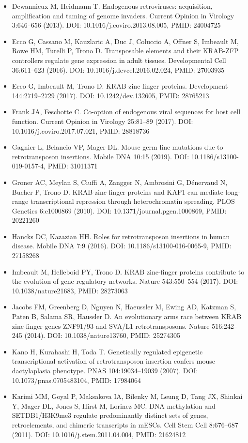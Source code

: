 \documentclass[11pt,a4paper]{article}
\begin{document}
\begin{itemize}
\item Dewannieux M, Heidmann T. Endogenous retroviruses: acquisition, amplification and taming of genome invaders. Current Opinion in Virology 3:646–656 (2013). DOI: 10.1016/j.coviro.2013.08.005, PMID: 24004725
\item Ecco G, Cassano M, Kauzlaric A, Duc J, Coluccio A, Offner S, Imbeault M, Rowe HM, Turelli P, Trono D. Transposable elements and their KRAB-ZFP controllers regulate gene expression in adult tissues. Developmental Cell 36:611–623 (2016). DOI: 10.1016/j.devcel.2016.02.024, PMID: 27003935
\item Ecco G, Imbeault M, Trono D. KRAB zinc finger proteins. Development 144:2719–2729 (2017). DOI: 10.1242/dev.132605, PMID: 28765213
\item Frank JA, Feschotte C. Co-option of endogenous viral sequences for host cell function. Current Opinion in Virology 25:81–89 (2017). DOI: 10.1016/j.coviro.2017.07.021, PMID: 28818736
\item Gagnier L, Belancio VP, Mager DL. Mouse germ line mutations due to retrotransposon insertions. Mobile DNA 10:15 (2019). DOI: 10.1186/s13100-019-0157-4, PMID: 31011371
\item Groner AC, Meylan S, Ciuffi A, Zangger N, Ambrosini G, Dénervaud N, Bucher P, Trono D. KRAB-zinc finger proteins and KAP1 can mediate long-range transcriptional repression through heterochromatin spreading. PLOS Genetics 6:e1000869 (2010). DOI: 10.1371/journal.pgen.1000869, PMID: 20221260
\item Hancks DC, Kazazian HH. Roles for retrotransposon insertions in human disease. Mobile DNA 7:9 (2016). DOI: 10.1186/s13100-016-0065-9, PMID: 27158268
\item Imbeault M, Helleboid PY, Trono D. KRAB zinc-finger proteins contribute to the evolution of gene regulatory networks. Nature 543:550–554 (2017). DOI: 10.1038/nature21683, PMID: 28273063
\item Jacobs FM, Greenberg D, Nguyen N, Haeussler M, Ewing AD, Katzman S, Paten B, Salama SR, Haussler D. An evolutionary arms race between KRAB zinc-finger genes ZNF91/93 and SVA/L1 retrotransposons. Nature 516:242–245 (2014). DOI: 10.1038/nature13760, PMID: 25274305
\item Kano H, Kurahashi H, Toda T. Genetically regulated epigenetic transcriptional activation of retrotransposon insertion confers mouse dactylaplasia phenotype. PNAS 104:19034–19039 (2007). DOI: 10.1073/pnas.0705483104, PMID: 17984064
\item Karimi MM, Goyal P, Maksakova IA, Bilenky M, Leung D, Tang JX, Shinkai Y, Mager DL, Jones S, Hirst M, Lorincz MC. DNA methylation and SETDB1/H3K9me3 regulate predominantly distinct sets of genes, retroelements, and chimeric transcripts in mESCs. Cell Stem Cell 8:676–687 (2011). DOI: 10.1016/j.stem.2011.04.004, PMID: 21624812

\end{itemize}
\end{document}
